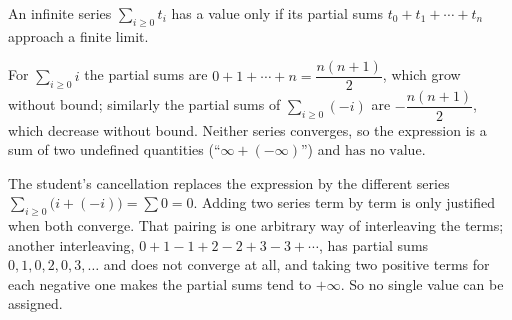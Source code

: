 An infinite series $\sum_{i\ge0}t_i$ has a value only if its partial sums $t_0+t_1+\cdots+t_n$ approach a finite limit.

For $\sum_{i\ge0}i$ the partial sums are $0+1+\cdots+n=\dfrac{n(n+1)}{2}$, which grow without bound; similarly the partial sums of $\sum_{i\ge0}(-i)$ are $-\dfrac{n(n+1)}{2}$, which decrease without bound. Neither series converges, so the expression is a sum of two undefined quantities (``$\infty+(-\infty)$'') and $\boxed{\text{has no value}}$.

The student's cancellation replaces the expression by the different series $\sum_{i\ge0}\bigl(i+(-i)\bigr)=\sum0=0$. Adding two series term by term is only justified when both converge. That pairing is one arbitrary way of interleaving the terms; another interleaving, $0+1-1+2-2+3-3+\cdots$, has partial sums $0,1,0,2,0,3,\dots$ and does not converge at all, and taking two positive terms for each negative one makes the partial sums tend to $+\infty$. So no single value can be assigned.

